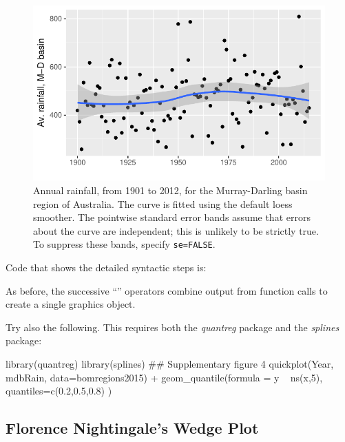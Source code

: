 \begin{figure}
\begin{Schunk}


\centerline{\includegraphics[width=\textwidth]{figs/09-qplot-smooth-1} }

\end{Schunk}
\caption{Annual rainfall, from 1901 to 2012, for the Murray-Darling
  basin region of Australia.  The curve is fitted using the default
  loess smoother. The pointwise standard error bands assume that
  errors about the curve are independent; this is unlikely to be
  strictly true. To suppress these bands, specify
  \texttt{se=FALSE}.\label{fig:ggrain}}
\end{figure}

Code that shows the detailed syntactic steps is:

As before, the successive ``\txtt{+}'' operators combine output from
function calls to create a single graphics object.

Try also the following.  This requires both the {\em quantreg}
package and the {\em splines} package:
\begin{Schunk}
\begin{Sinput}
library(quantreg)
library(splines)
## Supplementary figure 4
quickplot(Year, mdbRain, data=bomregions2015) +
          geom_quantile(formula = y ~ ns(x,5),
          quantiles=c(0.2,0.5,0.8) )
\end{Sinput}
\end{Schunk}

\subsection*{Florence Nightingale's Wedge Plot}

